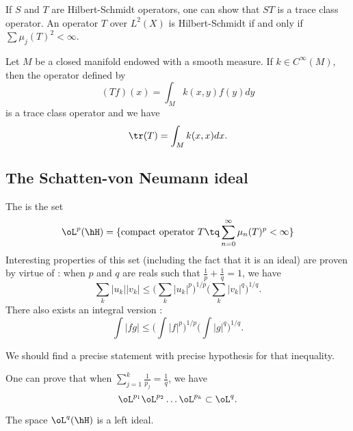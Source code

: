 If $S$ and $T$ are Hilbert-Schmidt operators, one can show that $ST$ is a trace class operator. An operator $T$ over $L^2(X)$ is Hilbert-Schmidt if and only if $\sum\mu_j(T)^2<\infty$.

\begin{lemma}
Let $M$ be a closed manifold endowed with a smooth measure. If $k\in C^{\infty}(M)$, then the operator defined by
\[ 
  (Tf)(x)=\int_Mk(x,y)f(y)dy
\]
is a trace class operator and we have
\begin{equation}
\tr(T)=\int_Mk(x,x)dx.
\end{equation}

\end{lemma}


\subsection{The Schatten-von Neumann ideal}

The  is the set
\[ 
  \oL^p(\hH)=\{ \textrm{compact operator } T\tq \sum_{n=0}^{\infty}\mu_n(T)^p<\infty \}
\]
Interesting properties of this set (including the fact that it is an ideal) are proven by virtue of : when $p$ and $q$ are reals such that $\frac{1}{ p }+\frac{1}{ q }=1$, we have
\begin{equation}
\sum_{k}| u_k | |v_k |\leq \Big( \sum_{k}| u_k |^p \Big)^{1/p}\Big( \sum_{k}| v_k |^{q} \Big)^{1/q}.
\end{equation}
There also exists an integral version :
\begin{equation}
\int | fg |\leq \Big( \int | f |^p \Big)^{1/p}\Big( \int| g |^q \Big)^{1/q}.
\end{equation}

\begin{probleme}
	We should find a precise statement with precise hypothesis for that inequality.
\end{probleme}

One can prove that when $\sum_{j=1}^{k}\frac{1}{ p_j }=\frac{1}{ q }$, we have
\begin{equation}    \label{EqPropLLLsvn}
\oL^{p_1}\oL^{p_2}\ldots\oL^{p_k}\subset \oL^q.
\end{equation}

\begin{lemma}
The space $\oL^q(\hH)$ is a left ideal.
\end{lemma}

